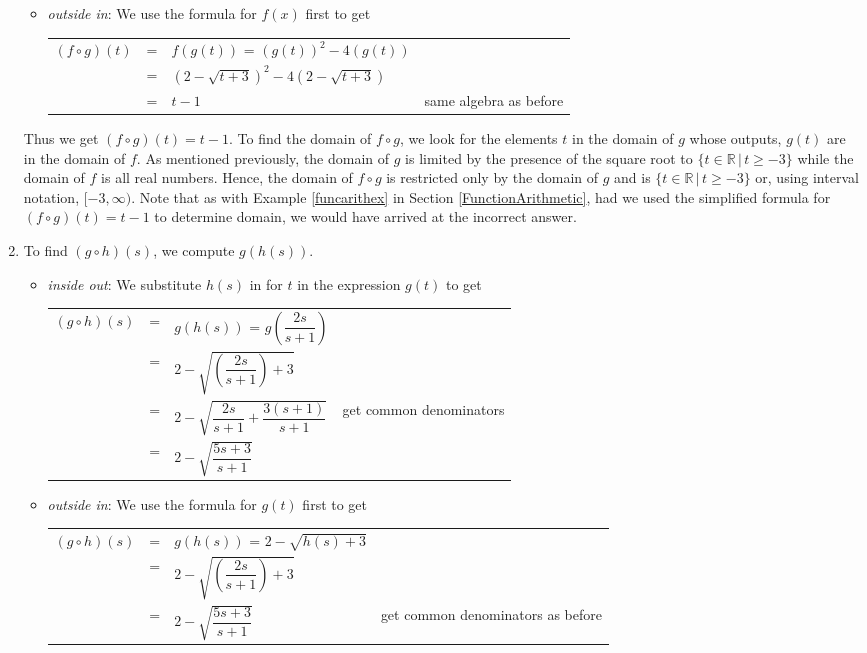 \documentclass{ximera}
\begin{document}
\begin{ex}
\begin{enumerate}
\begin{itemize}
\item  \textit{outside in}:  We use the formula for $f(x)$ first to get
\begin{longtable}{rclr} $(f \circ g)(t)$ & = & $f(g(t))$ = $\left(g(t)\right)^2 - 4\left(g(t)\right)$& \\ [2pt]
 & = & $\left(2-\sqrt{t+3}\right)^2 - 4\left(2-\sqrt{t+3}\right)$ & \\[2pt] 
 & = & $t-1$ & same algebra as before \\
 \end{longtable}

\end{itemize}

Thus we get $(f \circ g)(t) = t-1$.  To find the domain of $f \circ g$, we look for the elements $t$ in the domain of $g$ whose outputs, $g(t)$ are in the domain of $f$.   As mentioned previously, the domain of $g$ is limited by the presence of the square root to  $\{ t \in \mathbb{R} \, | \, t \geq -3\}$  while the domain of $f$ is all real numbers.  Hence,  the domain of $f \circ g$ is restricted only by the domain of $g$ and is $\{ t \in \mathbb{R} \, | \, t \geq -3\}$ or, using interval notation,  $[-3, \infty)$.  Note that as with Example \ref{funcarithex}  in Section \ref{FunctionArithmetic}, had we used the simplified formula for $(f \circ g)(t) = t-1$  to determine domain, we would have arrived at the incorrect answer.



\item  To find $(g \circ h)(s)$, we compute $g(h(s))$. 

\begin{itemize}

\item  \textit{inside out}: We substitute $h(s)$ in for $t$ in the expression $g(t)$  to get 
\begin{longtable}{rclr} $(g \circ h)(s)$ & = & $g(h(s))$ = $g\left(\dfrac{2s}{s+1}\right)$  & \\ [12pt]
 & = & $2 - \sqrt{\left(\dfrac{2s}{s+1}\right)+3}$ & \\[12pt] 
 & = & $2 - \sqrt{\dfrac{2s}{s+1} + \dfrac{3(s+1)}{s+1}}$ & get common denominators\\ [12pt]
 & = & $2 - \sqrt{\dfrac{5s+3}{s+1}}$ & \\
 \end{longtable}

\item  \textit{outside in}:  We use the formula for $g(t)$ first to get
\begin{longtable}{rclr} $(g \circ h)(s)$ & = & $g(h(s))$ = $2 - \sqrt{h(s)+3}$& \\ [2pt]
  & = & $2 - \sqrt{\left(\dfrac{2s}{s+1}\right)+3}$ & \\[12pt] 
 & = & $2 - \sqrt{\dfrac{5s+3}{s+1}}$ & get common denominators as before\\
 \end{longtable}


\end{itemize}
\end{enumerate}
\end{ex}
\end{document}
